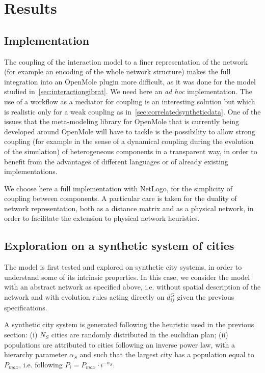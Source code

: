 %


\section{Results}


\subsection{Implementation}

The coupling of the interaction model to a finer representation of the network (for example an encoding of the whole network structure) makes the full integration into an OpenMole plugin more difficult, as it was done for the model studied in~\ref{sec:interactiongibrat}. We need here an \emph{ad hoc} implementation. The use of a workflow as a mediator for coupling is an interesting solution but which is realistic only for a weak coupling as in~\ref{sec:correlatedsyntheticdata}. One of the issues that the meta-modeling library for OpenMole that is currently being developed around OpenMole will have to tackle is the possibility to allow strong coupling (for example in the sense of a dynamical coupling during the evolution of the simulation) of heterogeneous components in a transparent way, in order to benefit from the advantages of different languages or of already existing implementations. 

We choose here a full implementation with NetLogo, for the simplicity of coupling between components. A particular care is taken for the duality of network representation, both as a distance matrix and as a physical network, in order to facilitate the extension to physical network heuristics.



\subsection{Exploration on a synthetic system of cities}


The model is first tested and explored on synthetic city systems, in order to understand some of its intrinsic properties. In this case, we consider the model with an abstract network as specified above, i.e. without spatial description of the network and with evolution rules acting directly on $d^G_{ij}$ given the previous specifications. 


A synthetic city system is generated following the heuristic used in the previous section: (i) $N_S$ cities are randomly distributed in the euclidian plan; (ii) populations are attributed to cities following an inverse power law, with a hierarchy parameter $\alpha_S$ and such that the largest city has a population equal to $P_{max}$, i.e. following $P_i = P_{max} \cdot i^{-\alpha_S}$.



